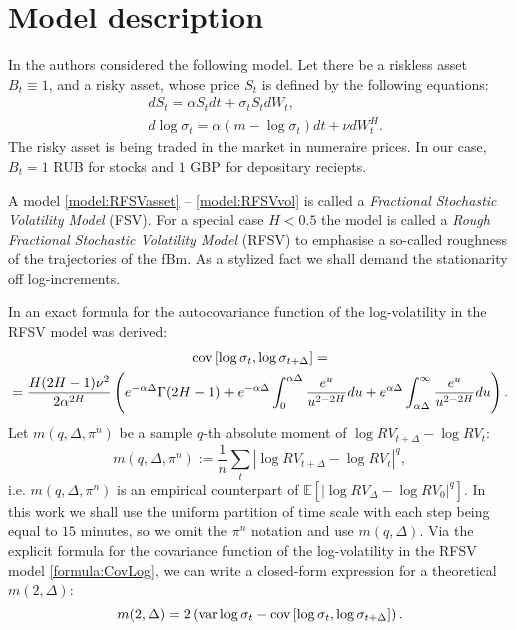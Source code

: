 

\section{Model description}
    In \cite{GatheralRosenbaum2014} the authors considered the following model. 
    Let there be a riskless asset $B_t \equiv 1$, and a risky asset, whose price $S_t$ is defined 
    by the following equations: 
    \begin{align}
        & dS_t          = \alpha S_t dt + \sigma_t S_tdW_t,               \label{model:RFSVasset} \\
        & d\log\sigma_t = \alpha (m - \log\sigma_t) dt + \nu dW_t^H.      \label{model:RFSVvol}
    \end{align}
    The risky asset is being traded in the market in numeraire prices. In our case, $B_t = 1$ RUB for stocks and $1$ GBP for depositary reciepts.
    \begin{definition}
        A model \eqref{model:RFSVasset} -- \eqref{model:RFSVvol} is called a 
        \emph{Fractional Stochastic Volatility Model} (FSV). For a special case $H < 0.5$ the 
        model is called a \emph{Rough Fractional Stochastic Volatility Model} (RFSV) to emphasise a 
        so-called roughness of the trajectories of the fBm. 
        As a stylized fact we shall demand the stationarity off log-increments.
    \end{definition}

    In \cite{Cheridito2003} an exact formula for the autocovariance function of the log-volatility in the RFSV model was derived:
    \begin{multline}\label{formula:CovLog}
        \operatorname*{cov}\left[\log \sigma_{t}, \log \sigma_{t+\Delta}\right] =\\= \frac{H(2H-1)\nu^2}{2\alpha^{2H}}\left(e^{-\alpha\Delta} \Gamma(2H-1) + e^{-\alpha\Delta} \int_{0}^{\alpha\Delta}\frac{e^u}{u^{2-2H}}du + e^{\alpha\Delta} \int_{\alpha\Delta}^{\infty}\frac{e^u}{u^{2-2H}}du\right).
    \end{multline}
    Let $m(q, \Delta, \pi^n)$ be a sample $q$-th absolute moment of $\log RV_{t+\Delta} - \log RV_t$:
    \begin{equation}
        m(q, \Delta, \pi^n) := \frac{1}{n} \sum_{t} \left|\log RV_{t + \Delta} - \log RV_t\right|^q,
    \end{equation}
    i.e. $m(q, \Delta, \pi^n)$ is an empirical counterpart of $\mathbb{E}\left[\left|\log RV_{\Delta} - \log RV_0\right|^q\right]$.
    In this work we shall use the uniform partition of time scale with each step being equal to $15$ minutes, so we omit the $\pi^n$ notation and use $m(q, \Delta)$.
    Via the explicit formula for the covariance function of the log-volatility in the RFSV model \eqref{formula:CovLog}, we can write 
    a closed-form expression for a theoretical $m(2, \Delta)$:
    \begin{equation}
        m(2, \Delta) = 2\left(\operatorname*{var} \log\sigma_{t} - \operatorname*{cov}\left[\log\sigma_{t}, \log\sigma_{t+\Delta}\right]\right).
    \end{equation}
